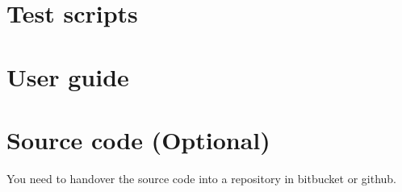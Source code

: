 \documentclass[12pt, a4paper]{report}
\begin{document}
\begin{appendices}
\chapter{Test scripts} %
\label{cha:test_scripts}


\chapter{User guide} %
\label{cha:user_guide}


\chapter{Source code (Optional)} %
\label{cha:source_code}
You need to handover the source code into a repository in bitbucket or github.
\end{appendices}
\end{document}
